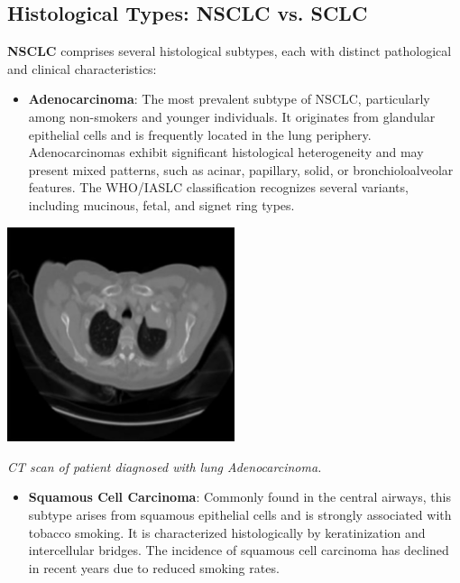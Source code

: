 \subsection{Histological Types: NSCLC vs. SCLC}

\textbf{NSCLC} comprises several histological subtypes, each with distinct pathological and clinical 
characteristics:

\begin{itemize}
    \item \textbf{Adenocarcinoma}: The most prevalent subtype of NSCLC, particularly among 
    non-smokers and younger individuals. It originates from glandular epithelial cells and is 
    frequently located in the lung periphery. Adenocarcinomas exhibit significant histological 
    heterogeneity and may present mixed patterns, such as acinar, papillary, solid, or 
    bronchioloalveolar features. The WHO/IASLC classification recognizes several variants, including 
    mucinous, fetal, and signet ring types. \cite{nlm2025}
\end{itemize}

\vspace{1em}
\begin{center}
    \includegraphics[width=0.5\textwidth]{assets/01-overview/lc-adc-ct.jpeg}

    \small\textit{CT scan of patient diagnosed with lung Adenocarcinoma. \cite{SHATNAWI2025100188}}
\end{center}
\vspace{1em}

\begin{itemize}
    \item \textbf{Squamous Cell Carcinoma}: Commonly found in the central airways, this subtype 
    arises from squamous epithelial cells and is strongly associated with tobacco smoking. It is 
    characterized histologically by keratinization and intercellular bridges. The incidence of 
    squamous cell carcinoma has declined in recent years due to reduced smoking rates. 
    \cite{nlm2025}
\end{itemize}

